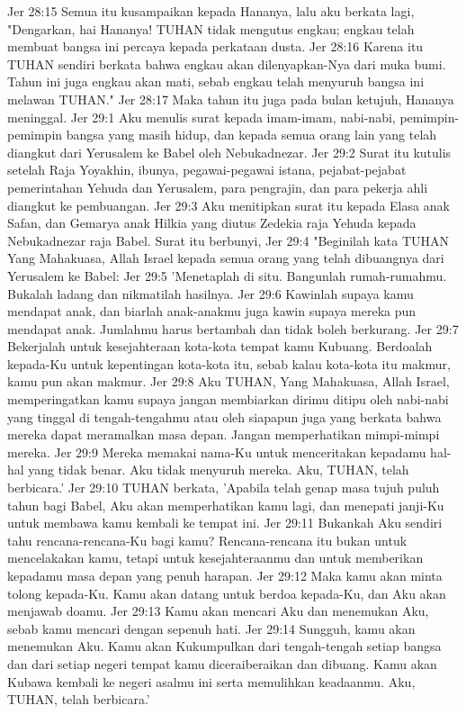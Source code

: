 Jer 28:15  Semua itu kusampaikan kepada Hananya, lalu aku berkata lagi, "Dengarkan, hai Hananya! TUHAN tidak mengutus engkau; engkau telah membuat bangsa ini percaya kepada perkataan dusta.
Jer 28:16  Karena itu TUHAN sendiri berkata bahwa engkau akan dilenyapkan-Nya dari muka bumi. Tahun ini juga engkau akan mati, sebab engkau telah menyuruh bangsa ini melawan TUHAN."
Jer 28:17  Maka tahun itu juga pada bulan ketujuh, Hananya meninggal.
Jer 29:1  Aku menulis surat kepada imam-imam, nabi-nabi, pemimpin-pemimpin bangsa yang masih hidup, dan kepada semua orang lain yang telah diangkut dari Yerusalem ke Babel oleh Nebukadnezar.
Jer 29:2  Surat itu kutulis setelah Raja Yoyakhin, ibunya, pegawai-pegawai istana, pejabat-pejabat pemerintahan Yehuda dan Yerusalem, para pengrajin, dan para pekerja ahli diangkut ke pembuangan.
Jer 29:3  Aku menitipkan surat itu kepada Elasa anak Safan, dan Gemarya anak Hilkia yang diutus Zedekia raja Yehuda kepada Nebukadnezar raja Babel. Surat itu berbunyi,
Jer 29:4  "Beginilah kata TUHAN Yang Mahakuasa, Allah Israel kepada semua orang yang telah dibuangnya dari Yerusalem ke Babel:
Jer 29:5  'Menetaplah di situ. Bangunlah rumah-rumahmu. Bukalah ladang dan nikmatilah hasilnya.
Jer 29:6  Kawinlah supaya kamu mendapat anak, dan biarlah anak-anakmu juga kawin supaya mereka pun mendapat anak. Jumlahmu harus bertambah dan tidak boleh berkurang.
Jer 29:7  Bekerjalah untuk kesejahteraan kota-kota tempat kamu Kubuang. Berdoalah kepada-Ku untuk kepentingan kota-kota itu, sebab kalau kota-kota itu makmur, kamu pun akan makmur.
Jer 29:8  Aku TUHAN, Yang Mahakuasa, Allah Israel, memperingatkan kamu supaya jangan membiarkan dirimu ditipu oleh nabi-nabi yang tinggal di tengah-tengahmu atau oleh siapapun juga yang berkata bahwa mereka dapat meramalkan masa depan. Jangan memperhatikan mimpi-mimpi mereka.
Jer 29:9  Mereka memakai nama-Ku untuk menceritakan kepadamu hal-hal yang tidak benar. Aku tidak menyuruh mereka. Aku, TUHAN, telah berbicara.'
Jer 29:10  TUHAN berkata, 'Apabila telah genap masa tujuh puluh tahun bagi Babel, Aku akan memperhatikan kamu lagi, dan menepati janji-Ku untuk membawa kamu kembali ke tempat ini.
Jer 29:11  Bukankah Aku sendiri tahu rencana-rencana-Ku bagi kamu? Rencana-rencana itu bukan untuk mencelakakan kamu, tetapi untuk kesejahteraanmu dan untuk memberikan kepadamu masa depan yang penuh harapan.
Jer 29:12  Maka kamu akan minta tolong kepada-Ku. Kamu akan datang untuk berdoa kepada-Ku, dan Aku akan menjawab doamu.
Jer 29:13  Kamu akan mencari Aku dan menemukan Aku, sebab kamu mencari dengan sepenuh hati.
Jer 29:14  Sungguh, kamu akan menemukan Aku. Kamu akan Kukumpulkan dari tengah-tengah setiap bangsa dan dari setiap negeri tempat kamu diceraiberaikan dan dibuang. Kamu akan Kubawa kembali ke negeri asalmu ini serta memulihkan keadaanmu. Aku, TUHAN, telah berbicara.'
